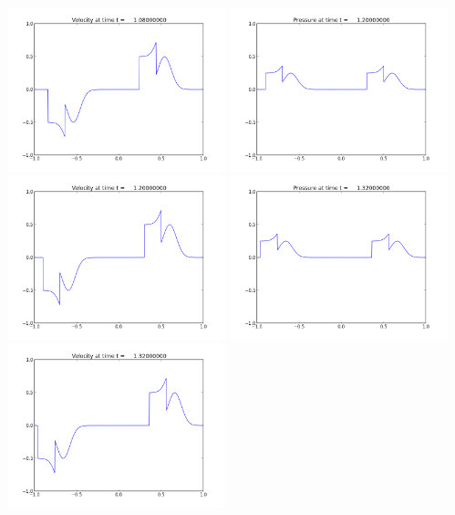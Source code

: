 \documentclass[11pt]{article}
\begin{document}
\includegraphics[width=0.475\textwidth]{frame0009fig2.png}
\vskip 10pt 
\includegraphics[width=0.475\textwidth]{frame0010fig1.png}
\includegraphics[width=0.475\textwidth]{frame0010fig2.png}
\vskip 10pt 
\includegraphics[width=0.475\textwidth]{frame0011fig1.png}
\includegraphics[width=0.475\textwidth]{frame0011fig2.png}
\end{document}
